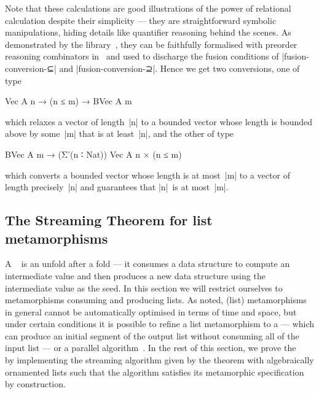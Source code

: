 Note that these calculations are good illustrations of the power of relational calculation despite their simplicity --- they are straightforward symbolic manipulations, hiding details like quantifier reasoning behind the scenes.
As demonstrated by the  library~\citep{Mu-AoPA}, they can be faithfully formalised with preorder reasoning combinators in \Agda\ and used to discharge the fusion conditions of |fusion-conversion-⊆| and |fusion-conversion-⊇|.
Hence we get two conversions, one of type
\begin{code}
Vec A n → (n ≤ m) → BVec A m
\end{code}
which relaxes a vector of length~|n| to a bounded vector whose length is bounded above by some~|m| that is at least~|n|, and the other of type
\begin{code}
BVec A m → (Σ'(n ∶ Nat)) Vec A n × (n ≤ m)
\end{code}
which converts a bounded vector whose length is at most~|m| to a vector of length precisely~|n| and guarantees that |n|~is at most~|m|.

\subsection{The Streaming Theorem for list metamorphisms}
\label{sec:metamorphism-streaming}

A ~\citep{Gibbons-metamorphisms} is an unfold after a fold --- it consumes a data structure to compute an intermediate value and then produces a new data structure using the intermediate value as the seed.
In this section we will restrict ourselves to metamorphisms consuming and producing lists.
As \citeauthor{Gibbons-metamorphisms} noted, (list) metamorphisms in general cannot be automatically optimised in terms of time and space, but under certain conditions it is possible to refine a list metamorphism to a  --- which can produce an initial segment of the output list without consuming all of the input list --- or a parallel algorithm~\citep{Nakano-jigsaw}.
In the rest of this section, we prove the ~\citep[Theorem~30]{Bird-arithmetic-coding} by implementing the streaming algorithm given by the theorem with algebraically ornamented lists such that the algorithm satisfies its metamorphic specification by construction.

